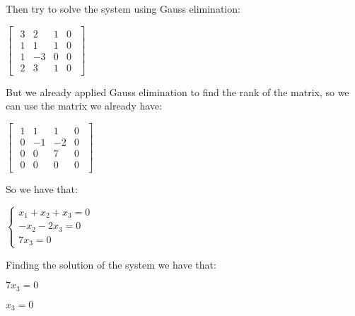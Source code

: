 \singlespacing

Then try to solve the system using Gauss elimination:

\singlespacing

\begin{math}
    \begin{bmatrix}
        \begin{array}{ccc|c}
            3 & 2  & 1 & 0 \\
            1 & 1  & 1 & 0 \\
            1 & -3 & 0 & 0 \\
            2 & 3  & 1 & 0
        \end{array}
    \end{bmatrix}
\end{math}

\singlespacing

But we already applied Gauss elimination to find the rank of the matrix, so we can use the matrix we already have:

\singlespacing

\begin{math}
    \begin{bmatrix}
        \begin{array}{ccc|c}
            1 & 1  & 1  & 0 \\
            0 & -1 & -2 & 0 \\
            0 & 0  & 7  & 0 \\
            0 & 0  & 0  & 0
        \end{array}
    \end{bmatrix}
\end{math}

\singlespacing

So we have that:

\singlespacing

\begin{math}
    \begin{cases}
        x_1 + x_2 + x_3 = 0 \\
        -x_2 - 2x_3 = 0     \\
        7x_3 = 0
    \end{cases}
\end{math}

\singlespacing

Finding the solution of the system we have that:

\singlespacing

$7x_3 = 0$

$x_3 = 0$

